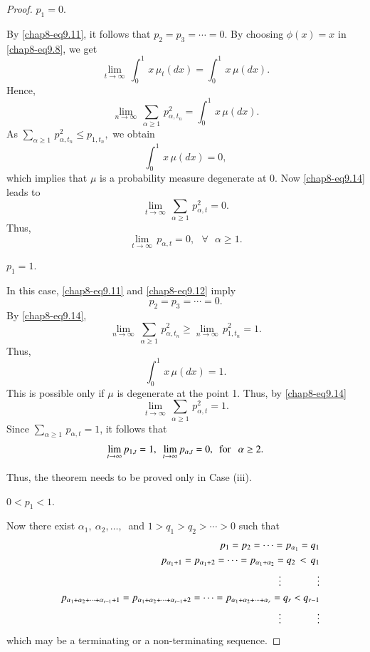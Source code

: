 \begin{proof}
 $p_1=0$. 
\smallskip

By \eqref{chap8-eq9.11}, it follows that  $p_2=p_3=\cdots =0$. By choosing $\phi(x)=x$ in \eqref{chap8-eq9.8}, we get  
\begin{equation}
	\underset{t\rightarrow\infty}{\lim}\, \int_0^1\, x\, \mu_t(dx) =\int_0^1\, x\, \mu(dx). \label{chap8-eq9.13}
\end{equation}
Hence, 
\begin{equation}
	\underset{n\rightarrow\infty}{\lim}\, \sum_{\alpha\geq 1}\, p^2_{\alpha,t_n}=\int_0^1\, x\, \mu(dx).\label{chap8-eq9.14}
\end{equation}
As $\sum_{\alpha\geq 1}\, p^2_{\alpha,t_n}\leq p_{1, t_n},$
we obtain 
$$
\int_0^1\, x\, \mu(dx)=0,
$$
which implies that $\mu$ is a probability measure degenerate at 0. 
Now \eqref{chap8-eq9.14} leads to   
$$
\underset{t\rightarrow\infty}{\lim}\, \sum_{\alpha\geq 1}\,  p^2_{\alpha,t}=0.
$$ 
Thus, 
$$
\underset{t\rightarrow\infty}{\lim}\,  p_{\alpha,t}=0, \ \ \ \forall \ \ \ \alpha\geq 1.
$$
\smallskip

 $p_1=1$. 
\smallskip

In this case, \eqref{chap8-eq9.11} and \eqref{chap8-eq9.12} imply
$$
p_2=p_3=\cdots =0.
$$
By \eqref{chap8-eq9.14}, 
$$
\underset{n\rightarrow\infty}{\lim}\, \sum_{\alpha\geq 1}\, p^2_{\alpha,t_n}\geq \underset{n\rightarrow\infty}{\lim}\, p^2_{1, t_n}=1.
$$  
Thus, 
$$ \int_0^1\, x\, \mu(dx)=1.$$
This is possible only if $\mu$ is degenerate at the point 1. Thus,  by \eqref{chap8-eq9.14} 
$$
\underset{t\rightarrow\infty}{\lim}\, \sum_{\alpha\geq 1}\, p^2_{\alpha,t}=1.
$$ 
Since  $\displaystyle\sum_{\alpha\geq 1}\, p_{\alpha,t}=1$,  it follows that 
$$
\underset{t\rightarrow\infty}{\lim}\, p_{1,t}=1,\ \ \underset{t\rightarrow\infty}{\lim}\, p_{\alpha,t}=0, \ \ {\rm for} \ \ \ \alpha\geq 2.
$$ 

Thus, the theorem needs to be proved only in Case (iii). 
\smallskip

 $0< p_1< 1.$ 
\smallskip

Now there exist $\alpha_1,\ \alpha_2,\ldots,\ $ and $1> q_1>q_2>\cdots >0$ such that   
\begin{eqnarray*}
	&& p_1=p_2=\cdots =p_{\alpha_1}=q_1 \\ 
	&& p_{\alpha_1+1}=p_{\alpha_1+2}=\cdots =p_{\alpha_1+\alpha_2}= q_2\, <\, q_1 \\ 
	&& \hskip 1in  \vdots  \hskip 0.5in \vdots   \\  
	&& p_{\alpha_1+\alpha_2+\cdots +\alpha_{r-1}+1}=p_{\alpha_1+\alpha_2+\cdots +\alpha_{r-1}+2}=\cdots = p_{\alpha_1+\alpha_2+\cdots +\alpha_{r}}= q_r < q_{r-1} \\ 
	&& \hskip 1in  \vdots  \hskip 0.5in \vdots  
\end{eqnarray*}
which may be a terminating or a non-terminating sequence.  


\end{proof}

